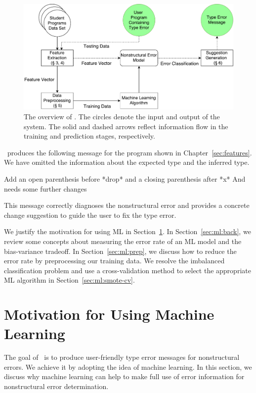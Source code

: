 \documentclass[12pt]{report}	%
\begin{document}
\begin{figure}
\centering
\includegraphics[scale=.6]{images/Learnskell.pdf}
\caption{The overview of \newCompiler. The circles denote the input
and output of the system. 
The solid and dashed arrows
reflect information flow in the training and prediction
stages, respectively.
}
\label{fig:arch}
\end{figure}

\newCompiler\ produces the following message
for the  program shown in Chapter~\ref{sec:features}.
We have omitted
the information about the expected type and the inferred type.
%
\begin{program}
Add an open parenthesis before *drop* and a closing parenthesis after *x*
And needs some further changes
\end{program}
%
This message correctly diagnoses the nonstructural error and 
provides a concrete change suggestion to guide the user to fix
the type error. 


We justify the motivation for using ML in Section~\ref{sec:ml:motivation}.
In Section~\ref{sec:ml:back}, we review some concepts about
measuring the error rate of an ML model
and the bias-variance tradeoff.
In Section~\ref{sec:ml:prep}, we discuss
how to reduce the error rate by preprocessing our training data.
We resolve the
imbalanced classification problem
and use a cross-validation method to
select the appropriate ML algorithm in Section~\ref{sec:ml:smote-cv}.


\section{Motivation for Using Machine Learning}
\label{sec:ml:motivation}

The goal of \newCompiler\ is to produce
user-friendly type error messages for nonstructural errors.
We achieve it by adopting the idea of machine learning.
In this section, we discuss why machine learning
can help to make full use of error information for
nonstructural error determination.
\end{document}
